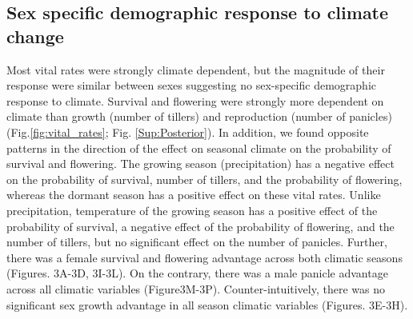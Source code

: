 \documentclass[12pt]{article}
\begin{document}
\subsection*{Sex specific demographic response to climate change}
Most vital rates were strongly climate dependent, but the magnitude of their response were similar between sexes suggesting no sex-specific demographic response to climate. 
Survival and flowering were strongly more dependent on climate than growth (number of tillers) and reproduction (number of panicles) (Fig.\ref{fig:vital_rates}; Fig. \ref{Sup:Posterior}).
In addition, we found opposite patterns in the direction of the effect on seasonal climate on the probability of survival and flowering.
The growing season (precipitation) has a negative effect on the probability of survival, number of tillers, and the probability of flowering, whereas the dormant season has a positive effect on these vital rates. 
Unlike precipitation, temperature of the growing season has a positive effect of the probability of survival, a negative effect of the probability of flowering, and the number of tillers, but no significant effect on the number of panicles. 
Further, there was a female survival and flowering advantage across both climatic seasons (Figures. 3A-3D, 3I-3L). 
On the contrary, there was a male panicle advantage across all climatic variables (Figure3M-3P). 
Counter-intuitively, there was no significant sex growth advantage in all season climatic variables (Figures. 3E-3H). 
\end{document}
